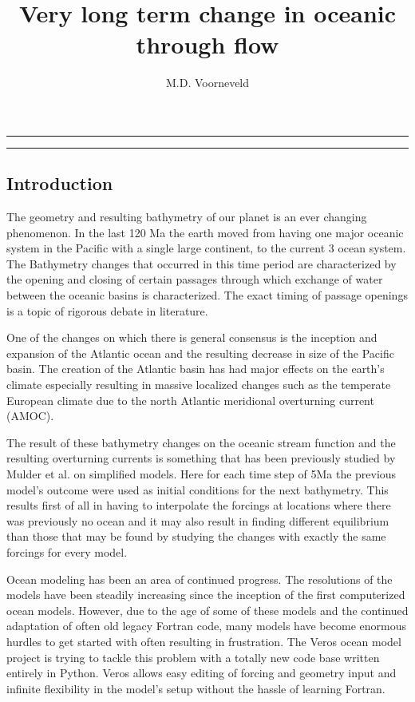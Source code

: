 \documentclass[a4paper]{article}
\title{Very long term change in oceanic through flow}
\author{M.D. Voorneveld}
\begin{document}
\maketitle
\noindent\rule{\textwidth}{1pt}
\begin{abstract}

\end{abstract}
\noindent\rule{\textwidth}{1pt}
\begin{multicols}{2}
\section{Introduction}

The geometry and resulting bathymetry of our planet is an ever changing phenomenon\cite{besse2002apparent}. In the last 120 Ma the earth moved from having one major oceanic system in the Pacific with a single large continent, to the current 3 ocean system. The Bathymetry changes that occurred in this time period are characterized by the opening and closing of certain passages through which exchange of water between the oceanic basins is characterized. The exact timing of passage openings is a topic of rigorous debate in literature\cite{Scher2006Apr}\cite{Schmidt2007Jan}.


One of the changes on which there is general consensus is the inception and expansion of the Atlantic ocean and the resulting decrease in size of the Pacific basin. The creation of the Atlantic basin has had major effects on the earth's climate especially resulting in massive localized changes such as the temperate European climate due to the north Atlantic meridional overturning current (AMOC).

The result of these bathymetry changes on the oceanic stream function and the resulting overturning currents is something that has been previously studied by Mulder et al.\cite{Mulder2017Jul} on simplified models. Here for each time step of 5Ma the previous model's outcome were used as initial conditions for the next bathymetry. This results first of all in having to interpolate the forcings at locations where there was previously no ocean and it may also result in finding different equilibrium than those that may be found by studying the changes with exactly the same forcings for every model.

Ocean modeling has been an area of continued progress. The resolutions of the models have been steadily increasing since the inception of the first computerized ocean models. However, due to the age of some of these models and the continued adaptation of often old legacy Fortran code, many models have become enormous hurdles to get started with often resulting in frustration. The Veros\cite{Hafner2018Aug} ocean model project is trying to tackle this problem with a totally new code base written entirely in Python. Veros allows easy editing of forcing and geometry input and infinite flexibility in the model's setup without the hassle of learning Fortran. 


\end{multicols}
\end{document}
